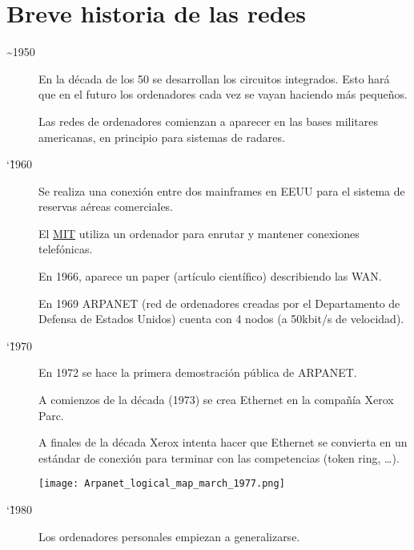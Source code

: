 \section{Breve historia de las redes}
\begin{description}
    \item[\textasciitilde 1950]
    En la década de los 50 se desarrollan los circuitos integrados. Esto hará que en el futuro los ordenadores cada vez se vayan haciendo más pequeños.

    Las redes de ordenadores comienzan a aparecer en las bases militares americanas, en principio para sistemas de radares.

    \item[\char`\~ 1960]
    Se realiza una conexión entre dos mainframes en EEUU para el sistema de reservas aéreas comerciales.

    El \href{https://es.wikipedia.org/wiki/Instituto_de_Tecnolog%C3%ADa_de_Massachusetts}{MIT} utiliza un ordenador para enrutar y mantener conexiones telefónicas.

    En 1966, aparece un paper (artículo científico) describiendo las WAN.

    En 1969 ARPANET (red de ordenadores creadas por el Departamento de Defensa de Estados Unidos) cuenta con 4 nodos (a 50kbit/s de velocidad).

    \item[\char`\~ 1970]
    En 1972 se hace la primera demostración pública de ARPANET.

    A comienzos de la década (1973) se crea Ethernet en la compañía Xerox Parc.

    A finales de la década Xerox intenta hacer que Ethernet se convierta en un estándar de conexión para terminar con las competencias (token ring, …).

    \begin{center}
        \vspace{-10pt}
        \texttt{[image: Arpanet\_logical\_map\_march\_1977.png]}
        \vspace{-5pt}
        \vspace{-13pt}
    \end{center}

    \item[\char`\~ 1980]
    Los ordenadores personales empiezan a generalizarse.


\end{description}
